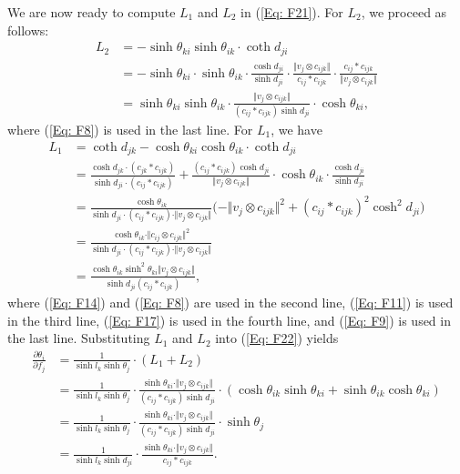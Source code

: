 \documentclass[12pt]{amsart}
\theoremstyle{definition}
\begin{document}
We are now ready to compute $L_1$ and $L_2$ in (\ref{Eq: F21}). 
For $L_2$, we proceed as follows:
\begin{align*}
L_2&=-\sinh \theta_{ki}\sinh\theta_{ik}\cdot\coth d_{ji}\\
&=-\sinh \theta_{ki}\cdot\sinh\theta_{ik}\cdot \frac{\cosh d_{ji}}{\sinh d_{ji}}\cdot\frac{\Vert v_j\otimes c_{ijk}\Vert }{c_{ij}\ast c_{ijk}}\cdot\frac{c_{ij}\ast c_{ijk}}{\Vert v_j\otimes c_{ijk}\Vert }\\
&=\sinh \theta_{ki} \sinh \theta_{ik}\cdot \frac{\Vert v_j\otimes c_{ijk}\Vert }{(c_{ij}\ast c_{ijk})\sinh d_{ji}}\cdot\cosh \theta_{ki},
\end{align*}
where (\ref{Eq: F8}) is used in the last line.
For $L_1$, we have
\begin{align*}
L_1&=\coth d_{jk}-\cosh \theta_{ki}\cosh\theta_{ik}\cdot\coth d_{ji}\\
&=\frac{\cosh d_{jk}\cdot (c_{jk}\ast c_{ijk})}{\sinh d_{ji}\cdot (c_{ij}\ast c_{ijk})}
+\frac{(c_{ij}\ast c_{ijk})\cosh d_{ji}}{\Vert v_j\otimes c_{ijk}\Vert }\cdot\cosh\theta_{ik}\cdot \frac{\cosh d_{ji}}{\sinh d_{ji}}\\
&=\frac{\cosh\theta_{ik}}{\sinh d_{ji}\cdot (c_{ij}\ast c_{ijk})\cdot \Vert v_j\otimes c_{ijk}\Vert }\big(-\Vert v_j\otimes c_{ijk}\Vert ^2+(c_{ij}\ast c_{ijk})^2\cosh^2 d_{ji}\big)\\
&=\frac{\cosh\theta_{ik}\cdot\Vert c_{ij}\otimes c_{ijk}\Vert ^2}{\sinh d_{ji}\cdot (c_{ij}\ast c_{ijk})\cdot \Vert v_j\otimes c_{ijk}\Vert }\\
&=\frac{\cosh\theta_{ik}\sinh^2 \theta_{ki}\Vert v_j\otimes c_{ijk}\Vert }{\sinh d_{ji}(c_{ij}\ast c_{ijk})},
\end{align*}
where (\ref{Eq: F14}) and (\ref{Eq: F8}) are used in the second line, (\ref{Eq: F11}) is used in the third line, (\ref{Eq: F17}) is used in the fourth line, and (\ref{Eq: F9}) is used in the last line.
Substituting $L_1$ and $L_2$ into (\ref{Eq: F22}) yields
\begin{equation*}
\begin{aligned}
\frac{\partial \theta_i}{\partial f_j}
&=\frac{1}{\sinh l_k\sinh \theta_j}\cdot(L_1+L_2)\\
&=\frac{1}{\sinh l_k\sinh \theta_j}\cdot\frac{\sinh \theta_{ki}\cdot \Vert v_j\otimes c_{ijk}\Vert }{(c_{ij}\ast c_{ijk})\sinh d_{ji}}\cdot (\cosh \theta_{ik}\sinh \theta_{ki}+\sinh \theta_{ik}\cosh \theta_{ki})\\
&=\frac{1}{\sinh l_k\sinh \theta_j}\cdot\frac{\sinh \theta_{ki}\cdot \Vert v_j\otimes c_{ijk}\Vert }{(c_{ij}\ast c_{ijk})\sinh d_{ji}}\cdot \sinh \theta_j\\
&=\frac{1}{\sinh l_k\sinh d_{ji}}\cdot\frac{\sinh \theta_{ki}\cdot \Vert v_j\otimes c_{ijk}\Vert }{c_{ij}\ast c_{ijk}}.
\end{aligned}
\end{equation*}
\end{document}
